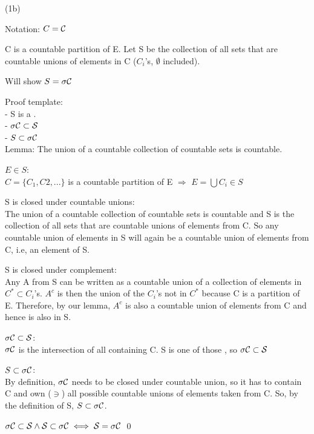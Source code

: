 (1b)

Notation: $ C = \cal{C} $

C is a countable partition of E. Let S be the collection of all sets that are countable unions of elements in C ($C_i$'s, $\emptyset$ included).

Will show $ S = \sigma \cal{C} $

Proof template:\\
- S is a \sa.\\
- $ \sigma \cal{C} \subset S $\\
- $ S \subset \sigma \cal{C} $\\

Lemma: The union of a countable collection of countable sets is countable.

$E \in S$: \\
$C = \{C_1, C2, ... \}$ is a countable partition of E 
$\Rightarrow$
$E = \bigcup C_i \in S $

S is closed under countable unions: \\
The union of a countable collection of countable sets is countable and S is the collection of all sets that are countable unions of elements from C. So any countable union of elements in S will again be a countable union of elements from C, i.e, an element of S.

S is closed under complement: \\
Any A from S can be written as a countable union of a collection of elements in $C^* \subset C_i$'s. $A^c$ is then the union of the $ C_i $'s not in $C^*$ because C is a partition of E. Therefore, by our lemma, $A^c$ is also a countable union of elements from C and hence is also in S.

$ \sigma \cal{C} \subset S $:
\\
$\sigma \cal{C}$ is the intersection of all \sa containing C. S is one of those \sa, so $ \sigma \cal{C} \subset S $

$ S \subset \sigma \cal{C} $:
\\
By definition, $\sigma \cal{C}$ needs to be closed under countable union, so it has to contain C and own ($\owns$) all possible countable unions of elements taken from C. So, by the definition of S, $S \subset \sigma \cal{C}$.

$ \sigma \cal{C} \subset S \land S \subset \sigma \cal{C} \;\Longleftrightarrow\;  S = \sigma \cal{C} $ \qed
